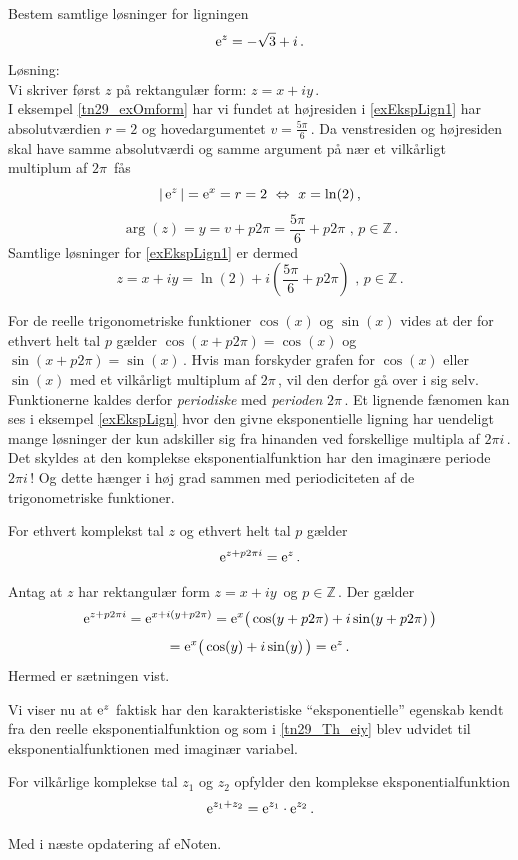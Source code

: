 \begin{example}\label{exEkspLign}
Bestem samtlige løsninger for ligningen
\begin{equation}\label{exEkspLign1}
\mathrm{e}^z=-\sqrt 3+i\,.
\end{equation}
Løsning:\\
Vi skriver først $z$ på rektangulær form: $z=x+iy\,$.\\ 
I eksempel \ref{tn29_exOmform} har vi fundet at højresiden i \ref{exEkspLign1} har absolutværdien $r=2$ og hovedargumentet $v=\frac{5\pi}6\,$. Da venstresiden og højresiden skal have samme absolutværdi og samme argument på nær et vilkårligt multiplum af $2\pi\,$ fås
$$
|\,\mathrm{e}^z\,|=\mathrm{e}^x=r=2\,\,\Leftrightarrow\,\,x=\ln(2)\,,$$
$$\arg(z)=y=v+p2\pi=\frac{5\pi}6 + p2\pi\,\,,\,p\in \mathbb Z\,.$$
Samtlige løsninger for \ref{exEkspLign1} er dermed
$$z=x+iy=\ln(2)+i(\frac{5\pi}6 + p2\pi)\,\,,\,p\in \mathbb Z\,.$$
 
\end{example}

For de reelle trigonometriske funktioner $\cos(x)$ og $\sin(x)$ vides at der for ethvert helt tal $p$ gælder $\cos(x+p2\pi)=\cos(x)$ og $\sin(x+p2\pi)=\sin(x)\,$. Hvis man forskyder grafen for $\cos(x)$ eller $\sin(x)$ med et vilkårligt multiplum af $2\pi\,$, vil den derfor gå over i sig selv. Funktionerne kaldes derfor \textit{periodiske} med \textit{perioden} $2\pi\,$.\bs
Et lignende fænomen kan ses i eksempel \ref{exEkspLign} hvor den givne eksponentielle lig\-ning har uendeligt mange løsninger der kun adskiller sig fra hinanden ved forskellige multipla af $2\pi i\,$. Det skyldes at den komplekse eksponentialfunktion har den ima\-ginære periode $2\pi i\,$! Og dette hænger i høj grad sammen med periodiciteten af de trigonometriske funktioner.

\begin{theorem}[Periodicitet af $\e^z$]
For ethvert komplekst tal $z$ og ethvert helt tal $p$ gælder
\begin{equation}
\mathrm{e}^{z+p2\pi i}=\mathrm{e}^z\,.
\end{equation}
\end{theorem}
\begin{bevis}
Antag at $z$ har rektangulær form $z=x+iy\,$ og $p\in \mathbb Z\,.$\bs
Der gælder
$$
\mathrm{e}^{z+p2\pi i}
=\mathrm{e}^{x+i(y+p2\pi)}
=\mathrm{e}^x\big(\cos(y+p2\pi)+i\sin(y+p2\pi)\,\big)$$
$$=\mathrm{e}^x\big(\cos(y)+i\sin(y)\,\big)
=\mathrm{e}^z\,.$$
Hermed er sætningen vist.
\end{bevis}
Vi viser nu at $\e^z$ faktisk har den karakteristiske ``eksponentielle'' egenskab kendt fra den reelle eksponentialfunktion og som i \ref{tn29_Th_eiy} blev udvidet til eksponentialfunktionen med imaginær variabel.\bs 
\begin{theorem}\label{tn29_Th_ez}
For vilkårlige komplekse tal $z_1$ og $z_2$ opfylder den komplekse eksponentialfunktion
\begin{equation}
\mathrm{e}^{z_1+z_2}=\mathrm{e}^{z_1}\cdot\mathrm{e}^{z_2}\,.
\end{equation}
\end{theorem}
\begin{bevis}
Med i næste opdatering af eNoten.
\end{bevis}

